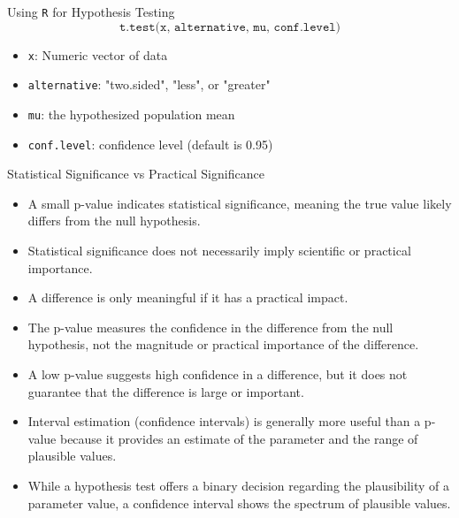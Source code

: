 \documentclass[9pt]{extarticle}
\begin{document}
\begin{conceptbox}{Using \texttt{R} for Hypothesis Testing}{}
    $$\texttt{t.test(x, alternative, mu, conf.level)}$$
    \begin{itemize}
        \item \texttt{x}: Numeric vector of data
        \item \texttt{alternative}: "two.sided", "less", or "greater"
        \item \texttt{mu}: the hypothesized population mean
        \item \texttt{conf.level}: confidence level (default is 0.95)
    \end{itemize}
\end{conceptbox}
\begin{conceptbox}{Statistical Significance vs Practical Significance}{}
    \begin{itemize}
        \item A small p-value indicates statistical significance, meaning the true value likely differs from the null hypothesis.
        \item Statistical significance does not necessarily imply scientific or practical importance.
        \item A difference is only meaningful if it has a practical impact.
        \item The p-value measures the confidence in the difference from the null hypothesis, not the magnitude or practical importance of the difference.
        \item A low p-value suggests high confidence in a difference, but it does not guarantee that the difference is large or important.
        \item Interval estimation (confidence intervals) is generally more useful than a p-value because it provides an estimate of the parameter and the range of plausible values.
        \item While a hypothesis test offers a binary decision regarding the plausibility of a parameter value, a confidence interval shows the spectrum of plausible values.
    \end{itemize}
\end{conceptbox}
\end{document}
